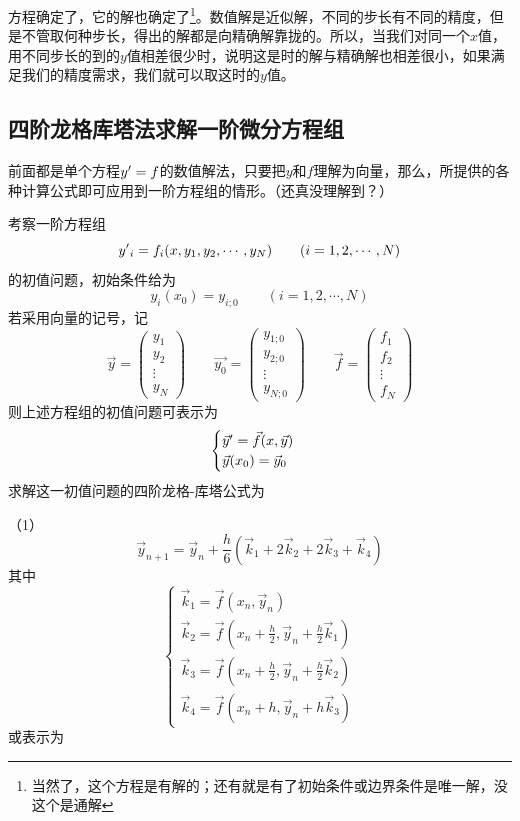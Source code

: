 方程确定了，它的解也确定了\footnote{当然了，这个方程是有解的；还有就是有了初始条件或边界条件是唯一解，没这个是通解}。数值解是近似解，不同的步长有不同的精度，但是不管取何种步长，得出的解都是向精确解靠拢的。所以，当我们对同一个$x$值，用不同步长的到的$y$值相差很少时，说明这是时的解与精确解也相差很小，如果满足我们的精度需求，我们就可以取这时的$y$值。



\subsection{四阶龙格库塔法求解一阶微分方程组}

前面都是单个方程$y\rq{}=f$的数值解法，只要把$y$和$f$理解为向量，那么，所提供的各种计算公式即可应用到一阶方程组的情形。（还真没理解到？）

考察一阶方程组
$$y\rq{}_i=f_i(x,y_1,y_2,\cdots,y_N)\qquad (i=1,2,\cdots,N)$$
的初值问题，初始条件给为
$$y_i(x_0)=y_{i;0}\qquad (i=1,2,\cdots,N)$$
若采用向量的记号，记
$$\vec{y}=\begin{pmatrix}y_1 \\ y_2 \\ \vdots \\ y_N\end{pmatrix}
\qquad
\vec{y_0}=\begin{pmatrix} y_{1;0} \\ y_{2;0} \\  \vdots \\ y_{N;0} \end{pmatrix}
\qquad
\vec{f} =\begin{pmatrix} f_1 \\ f_2 \\ \vdots \\  f_N \end{pmatrix}$$
则上述方程组的初值问题可表示为
$$\begin{cases}\vec{y}\rq{}=\vec{f}(x,\vec{y}) \\ \vec{y}(x_0)=\vec{y}_0 \end{cases}$$
求解这一初值问题的四阶龙格-库塔公式为

（1）
$$\vec{y}_{n+1}=\vec{y}_n+\frac{h}{6}(\vec{k}_1+2\vec{k}_2+2\vec{k}_3+\vec{k}_4)$$
其中
$$\begin{cases}
\vec{k}_1 = \vec{f}(x_n,\vec{y}_n)\\
\vec{k}_2 = \vec{f}(x_n+\frac{h}{2},\vec{y}_n+\frac{h}{2}\vec{k}_1)\\
\vec{k}_3 = \vec{f}(x_n+\frac{h}{2},\vec{y}_n+\frac{h}{2}\vec{k}_2)\\
\vec{k}_4=\vec{f}(x_n+h,\vec{y}_n+h\vec{k}_3) 
 \end{cases}$$
或表示为

